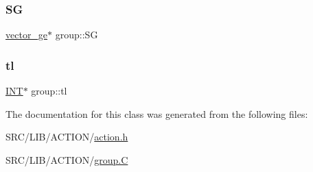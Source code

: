 \mbox{\label{classgroup_a4a4b982f7a7348eb4951cfa806f4b3d3}} 
\subsubsection{\texorpdfstring{SG}{SG}}
{\footnotesize\ttfamily \mbox{\hyperlink{classvector__ge}{vector\+\_\+ge}}$\ast$ group\+::\+SG}

\mbox{\label{classgroup_a2e0472009d44da381602bfab8bdd28c5}} 
\subsubsection{\texorpdfstring{tl}{tl}}
{\footnotesize\ttfamily \mbox{\hyperlink{galois_8h_a09fddde158a3a20bd2dcadb609de11dc}{I\+NT}}$\ast$ group\+::tl}



The documentation for this class was generated from the following files\+:\begin{DoxyCompactItemize}
\item 
S\+R\+C/\+L\+I\+B/\+A\+C\+T\+I\+O\+N/\mbox{\hyperlink{action_8h}{action.\+h}}\item 
S\+R\+C/\+L\+I\+B/\+A\+C\+T\+I\+O\+N/\mbox{\hyperlink{group_8_c}{group.\+C}}\end{DoxyCompactItemize}

